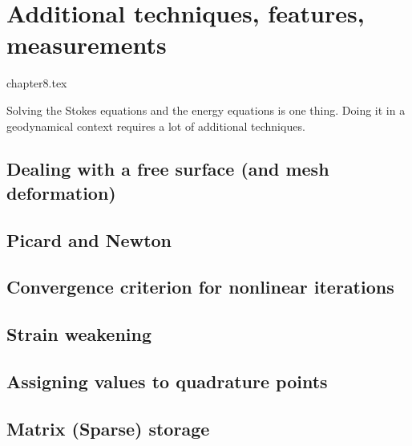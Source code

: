 \chapter{Additional techniques, features, measurements} %

\begin{flushright} {\tiny {\color{gray} chapter8.tex}} \end{flushright}

Solving the Stokes equations and the energy equations is one thing. Doing it in 
a geodynamical context requires a lot of additional techniques. 
\newpage %
\section{Dealing with a free surface (and mesh deformation)}\label{sec:freesurface}  
\newpage %
\section{Picard and Newton \label{ss_nonlinear}}  %
\newpage %
\section{Convergence criterion for nonlinear iterations\label{sec:nlconvcrit}} 
\newpage %
\section{Strain weakening} \label{sec:strainweakening}  %
\newpage %
\section{Assigning values to quadrature points \label{ss:averagings}}  %
\newpage %
\section{Matrix (Sparse) storage}\label{sec:sparse_storage}  %
\newpage %
